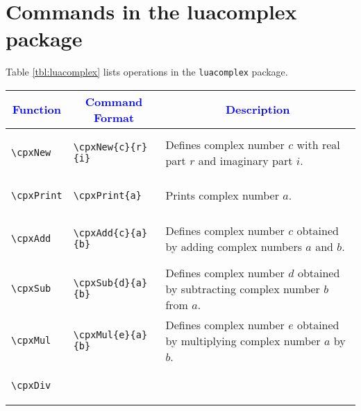 \documentclass{article}
\begin{document}
\section{Commands in the luacomplex package}
Table \ref{tbl:luacomplex} lists operations in the \verb|luacomplex| package.
\begin{longtable}{llm{6cm}}
\toprule
\multicolumn{1}{c}{\textcolor{blue}{Function}} & \multicolumn{1}{c}{\textcolor{blue}{Command Format}} & \multicolumn{1}{c}{\textcolor{blue}{Description}}\\
\toprule
\begin{lstlisting}
\cpxNew
\end{lstlisting} &
\begin{lstlisting}
\cpxNew{c}{r}{i}
\end{lstlisting} & Defines complex number \(c\) with real part \(r\) and imaginary part \(i\). \\
\midrule
\begin{lstlisting}
\cpxPrint
\end{lstlisting} &
\begin{lstlisting}
\cpxPrint{a}
\end{lstlisting} & Prints complex number \(a\). \\
\midrule
\begin{lstlisting}
\cpxAdd
\end{lstlisting} &
\begin{lstlisting}
\cpxAdd{c}{a}{b}
\end{lstlisting} & Defines complex number \(c\) obtained by adding complex numbers \(a\) and \(b\). \\
\midrule
\begin{lstlisting}
\cpxSub
\end{lstlisting} &
\begin{lstlisting}
\cpxSub{d}{a}{b}
\end{lstlisting} & Defines complex number \(d\) obtained by subtracting complex number \(b\) from  \(a\). \\
\midrule
\begin{lstlisting}
\cpxMul
\end{lstlisting} &
\begin{lstlisting}
\cpxMul{e}{a}{b}
\end{lstlisting} & Defines complex number \(e\) obtained by multiplying complex number \(a\) by \(b\). \\
\midrule
\begin{lstlisting}
\cpxDiv
\end{lstlisting} &

\end{longtable}
\end{document}
